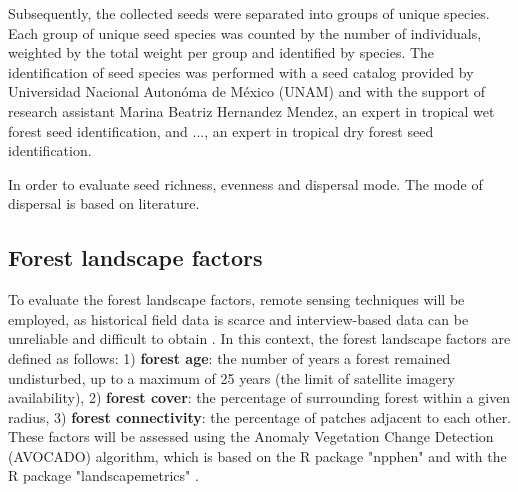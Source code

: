 Subsequently, the collected seeds were separated into groups of unique species. Each group of unique seed species  was counted by the number of individuals, weighted by the total weight per group and identified by species. The identification of seed species was performed with a seed catalog provided by Universidad Nacional Autonóma de México (UNAM) and with the support of research assistant Marina Beatriz Hernandez Mendez, an expert in tropical wet forest seed identification, and ..., an expert in tropical dry forest seed identification. 

In order to evaluate seed richness, evenness and dispersal mode. The mode of dispersal is based on literature.


\subsection{Forest landscape factors}
To evaluate the forest landscape factors, remote sensing techniques will be employed, as historical field data is scarce and interview-based data can be unreliable and difficult to obtain \citep{decuyperContinuousMonitoringForest2022}. In this context, the forest landscape factors are defined as follows: 1) \textbf{forest age}: the number of years a forest remained undisturbed, up to a maximum of 25 years (the limit of satellite imagery availability), 2) \textbf{forest cover}: the percentage of surrounding forest within a given radius, 3) \textbf{forest connectivity}: the percentage of patches adjacent to each other. 
These factors will be assessed using the Anomaly Vegetation Change Detection (AVOCADO) algorithm, which is based on the R package "npphen" and with the R package "landscapemetrics" \citep{chavez2017npphen, hesselbarth2019landscapemetrics}. 

